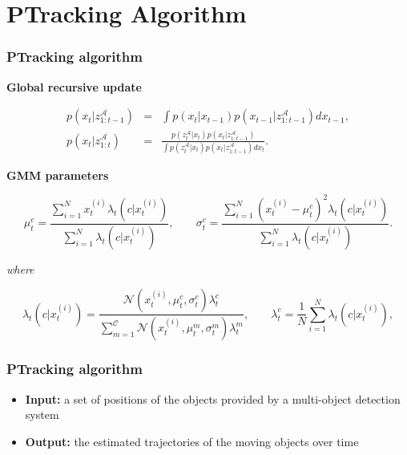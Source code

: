 \section{PTracking Algorithm}

\begin{frame}
	\frametitle{PTracking algorithm}
	
	\vspace{0.6cm}
	
	\textbf{Global recursive update}
	
	\vspace{-0.4cm}
	
	\begin{eqnarray*}
	p(x_t|z_{1:t-1}^\mathcal{A}) &=& \int p(x_t|x_{t-1}) p(x_{t-1}|z_{1:t-1}^\mathcal{A})dx_{t-1}, \\
	p(x_t|z_{1:t}^\mathcal{A}) &=& \frac{p(z_t^\mathcal{A}|x_t) p(x_t|z_{1:t-1}^\mathcal{A})}{\int p(z_t^\mathcal{A}|x_t)p(x_t|z_{1:t-1}^\mathcal{A})dx_t}.
	\end{eqnarray*}
	
	\textbf{GMM parameters}
	
	\vspace{-0.1cm}
	
	\begin{equation*}
		\mu_t^c = \frac{\sum_{i=1}^N x_t^{(i)}\lambda_t(c|x_t^{(i)})}{\sum_{i=1}^N \lambda_t(c|x_t^{(i)})},\;\;\;\;\;\;\;
		\sigma_t^c = \frac{\sum_{i=1}^N (x_t^{(i)} - \mu_t^c)^2\lambda_t(c|x_t^{(i)}) }{\sum_{i=1}^N \lambda_t(c|x_t^{(i)}) }.
	\end{equation*}
	
	\emph{where}
	
	\vspace{-0.5cm}
	
	\begin{equation*}
		\lambda_t(c|x_t^{(i)}) = \frac{\mathcal{N}(x_t^{(i)},\mu_t^c,\sigma_t^c)\lambda_t^c} {\sum_{m=1}^{\mathcal{C}}\mathcal{N}(x_t^{(i)},\mu_t^m,\sigma_t^m)\lambda_t^m},\;\;\;\;\;\;\;
		\lambda_t^c = \frac{1}{N} \sum_{i=1}^N \lambda_t(c|x_t^{(i)}),
	\end{equation*}
\end{frame}

\begin{frame}
	\frametitle{PTracking algorithm}
	
	\Large
	
	\begin{itemize}
		\item \textbf{Input:} a set of positions of the objects provided by a multi-object detection system
		
		\vspace{0.4cm}
		
		\item \textbf{Output:} the estimated trajectories of the moving objects over time
	\end{itemize}
\end{frame}

